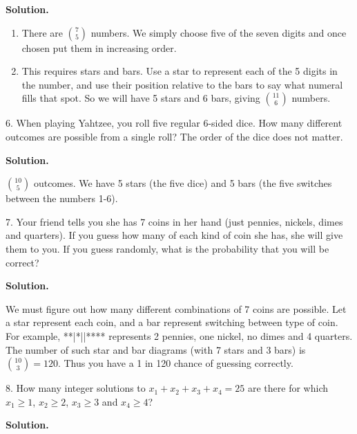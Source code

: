 \documentclass[10pt,]{book}
\theoremstyle{plain}
\theoremstyle{definition}
\theoremstyle{definition}
\theoremstyle{definition}
\numberwithin{equation}{section}
\begin{document}
\begin{exerciselist}
\noindent\textbf{Solution.}\hypertarget{solution-126}{}\quad
\leavevmode%
\begin{enumerate}[label=(\alph*)]
\item\hypertarget{li-596}{}
There are \({7 \choose 5}\) numbers.  We simply choose five of the seven digits and once chosen put them in increasing order.
%
\item\hypertarget{li-597}{}
This requires stars and bars.  Use a star to represent each of the 5 digits in the number, and use their position relative to the bars to say what numeral fills that spot.  So we will have 5 stars and 6 bars, giving \({11 \choose 6}\) numbers.
%
\end{enumerate}
\item[6.]\hypertarget{exercise-87}{}
When playing Yahtzee, you roll five regular 6-sided dice. How many different outcomes are possible from a single roll? The order of the dice does not matter.
%
\par\smallskip
\par\smallskip
\noindent\textbf{Solution.}\hypertarget{solution-127}{}\quad

\({10 \choose 5}\) outcomes. We have 5 stars (the five dice) and 5 bars (the five switches between the numbers 1-6).
%
\item[7.]\hypertarget{exercise-88}{}
Your friend tells you she has 7 coins in her hand (just pennies, nickels, dimes and quarters). If you guess how many of each kind of coin she has, she will give them to you. If you guess randomly, what is the probability that you will be correct?
%
\par\smallskip
\par\smallskip
\noindent\textbf{Solution.}\hypertarget{solution-128}{}\quad

We must figure out how many different combinations of 7 coins are possible. Let a star represent each coin, and a bar represent switching between type of coin. For example, **|*||**** represents 2 pennies, one nickel, no dimes and 4 quarters. The number of such star and bar diagrams (with 7 stars and 3 bars) is \({10 \choose 3} = 120\). Thus you have a 1 in 120 chance of guessing correctly.
%
\item[8.]\hypertarget{exercise-89}{}
How many integer solutions to \(x_1 + x_2 + x_3 + x_4  = 25\) are there for which \(x_1 \ge 1\), \(x_2 \ge 2\), \(x_3 \ge 3\) and \(x_4 \ge 4\)?
%
\par\smallskip
\par\smallskip
\noindent\textbf{Solution.}\hypertarget{solution-129}{}\quad


\end{exerciselist}
\end{document}
